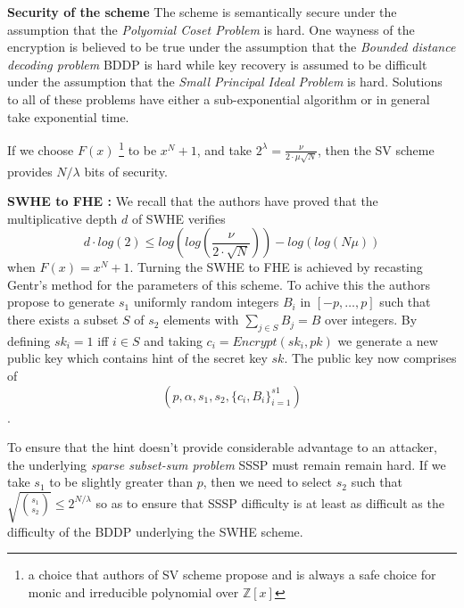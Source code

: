 \documentclass{acm_proc_article-sp}
\begin{document}
\textbf{Security of the scheme} The scheme is semantically secure under the assumption that the \textit{Polyomial Coset Problem} is hard. One wayness of the encryption is believed to be true under the assumption that the \textit{Bounded distance decoding problem} BDDP is hard while key recovery is assumed to be difficult under the assumption that the \textit{Small Principal Ideal Problem} is hard. Solutions to all of these problems have either a sub-exponential algorithm or in general take exponential time.

If we choose $F(x)$ \footnote{a choice that authors of SV scheme propose and is always a safe choice for monic and irreducible polynomial over $\mathbb{Z}[x] $} to be $x^N+1$, and take $2 ^ \lambda = \frac{\nu}{2\cdot \mu \sqrt{N}} $, then the SV scheme provides $N /\lambda$ bits of security.

\textbf{SWHE to FHE :} We recall that the authors have proved that the multiplicative depth $d$ of SWHE  verifies \[d \cdot log(2) \leq log( log(\frac{\nu}{2\cdot \sqrt{N}}) ) - log(log( N\mu))\]
when $F(x)= x^N+1$. Turning the SWHE to FHE is achieved by recasting Gentr's method for the parameters of this scheme. To achive this the authors propose to generate $s_1$ uniformly random integers $B_i$ in $[-p, \ldots, p]$ such that there exists a subset $S$ of $s_2$ elements with $\sum_{j \in S}{B_j}= B$ over integers. By defining $sk_i =1$ iff $i\in S$ and taking $c_i=Encrypt(sk_i,pk)$ we generate a new public key which contains hint of the secret key $sk$. The public key now comprises of \[(p, \alpha, s_1, s_2, \{c_i, B_i\}_{i=1}^{s1})\].

To ensure that the hint doesn't provide considerable advantage to an attacker, the underlying \textit{sparse subset-sum problem} SSSP must remain remain hard. If we take $s_1$ to be slightly greater than $p$, then we need to select $s_2$ such that $\sqrt {{s_1}  \choose {s_2} } \leq 2 ^{N/\lambda}$ so as to ensure that SSSP difficulty is at least as difficult as the difficulty of the BDDP underlying the SWHE scheme.
\end{document}
